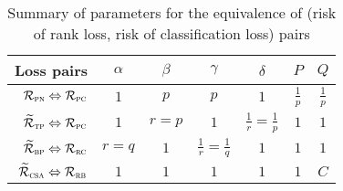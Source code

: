 \begin{table}[!h]
\centering
\caption{Summary of parameters for the equivalence of (risk of rank loss, risk of classification loss) pairs}
\label{tab:config}
\begin{tabular}{r*{6}{c}}
\toprule
{\bf Loss pairs}                                         & $\alpha$ & $\beta$ & $\gamma$ & $\delta$ & $P$ & $Q$ \\ \hline
$\mathcal{R}_\textsc{pn} \Leftrightarrow \mathcal{R}_\textsc{pc}$            & $1$      & $p$     & $p$      & $1$      & $\frac{1}{p}$ & $\frac{1}{p}$ \\
$\widetilde{\mathcal{R}}_\textsc{tp} \Leftrightarrow \mathcal{R}_\textsc{pc}$  & $1$      & $r=p$   & $1$      & $\frac{1}{r}=\frac{1}{p}$ & $1$ & $1$ \\
$\widetilde{\mathcal{R}}_\textsc{bp} \Leftrightarrow \mathcal{R}_\textsc{rc}$  & $r=q$    & $1$     & $\frac{1}{r}=\frac{1}{q}$ & $1$ & $1$ & $1$ \\
$\widetilde{\mathcal{R}}_\textsc{csa} \Leftrightarrow \mathcal{R}_\textsc{rb}$ & $1$      & $1$     & $1$      & $1$      & $1$ & $C$ \\
\bottomrule
\end{tabular}
\end{table}
